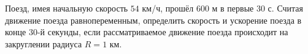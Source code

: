 Поезд, имея начальную скорость $54$ км/ч, прошёл $600$ м в первые
$30$ с. Считая движение поезда равнопеременным, определить скорость и
ускорение поезда в конце $30$-й секунды, если рассматриваемое движение
поезда происходит на закруглении радиуса $R=1$ км.
